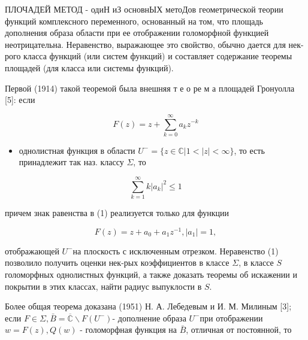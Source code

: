 \documentclass[10pt]{article}
\begin{document}
ПЛОЧАДЕЙ МЕТОД - одиН иЗ основнЫХ метоДов геометрической теории функций комплексного переменного, основанный на том, что площадь дополнения образа области при ее отображении голоморфной функцией неотрицательна. Неравенство, выражающее это свойство, обычно дается для нек-рого класса функций (или систем функций) и составляет содержание теоремы площадей (для класса или системы функций).



Первой (1914) такой теоремой была внешняя т е о ре м а площадей Гронуолла [5]: если



\[

F(z)=z+\sum_{k=0}^{\infty} a_{k} z^{-k}

\]



\begin{itemize}

  \item однолистная функция в области $U^{-}=\{z \in \mathbb{C}|1<| z \mid<\infty\}$, то есть принадлежит так наз. классу $\Sigma$, то

\end{itemize}



\[

\sum_{k=1}^{\infty} k\left|a_{k}\right|^{2} \leqslant 1

\]



причем знак равенства в (1) реализуется только для функции



\[

F(z)=z+a_{0}+a_{1} z^{-1},\left|a_{1}\right|=1,

\]



отображающей $U^{-}$на плоскость с исключенным отрезком. Неравенство (1) позволило получить оценки нек-рых коэффициентов в классе $\Sigma$, в классе $S$ голоморфных однолистных функций, а также доказать теоремы об искажении и покрытии в этих классах, найти радиус выпуклости в $S$.



Более общая теорема доказана (1951) Н. А. Лебедевым и И. М. Милиным [3]; если $F \in \Sigma, \bar{B}=\overline{\mathbb{C}} \backslash F\left(U^{-}\right)$- дополнение образа $U^{-}$при отображении $w=F(z), Q(w)$ - голоморфная функция на $\bar{B}$, отличная от постоянной, то
\end{document}

